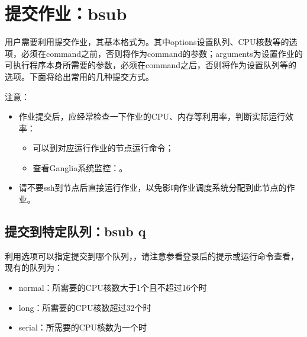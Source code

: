 \documentclass[a4paper,12pt,english]{sphinxmanual}
\begin{document}
\section{提交作业：bsub}
\label{\detokenize{lsf/lsf:bsub}}
\sphinxAtStartPar
用户需要利用提交作业，其基本格式为。其中options设置队列、CPU核数等的选项，必须在command之前，否则将作为command的参数；arguments为设置作业的可执行程序本身所需要的参数，必须在command之后，否则将作为设置队列等的选项。下面将给出常用的几种提交方式。

\sphinxAtStartPar
注意：
\begin{itemize}
\item {} 
\sphinxAtStartPar
作业提交后，应经常检查一下作业的CPU、内存等利用率，判断实际运行效率：
\begin{itemize}
\item {} 
\sphinxAtStartPar
可以到对应运行作业的节点运行命令；

\item {} 
\sphinxAtStartPar
查看Ganglia系统监控：。

\end{itemize}

\item {} 
\sphinxAtStartPar
请不要ssh到节点后直接运行作业，以免影响作业调度系统分配到此节点的作业。

\end{itemize}


\subsection{提交到特定队列：bsub \sphinxhyphen{}q}
\label{\detokenize{lsf/lsf:bsub-q}}
\sphinxAtStartPar
利用选项可以指定提交到哪个队列，，请注意参看登录后的提示或运行命令查看，现有的队列为：
\begin{itemize}
\item {} 
\sphinxAtStartPar
normal：所需要的CPU核数大于1个且不超过16个时

\item {} 
\sphinxAtStartPar
long：所需要的CPU核数超过32个时

\item {} 
\sphinxAtStartPar
serial：所需要的CPU核数为一个时

\end{itemize}
\end{document}
